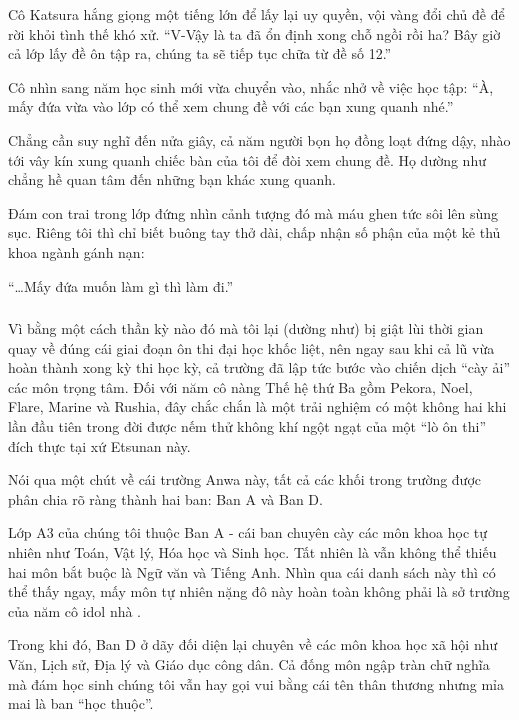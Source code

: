 \documentclass[../main.tex]{subfiles}
\begin{document}
Cô Katsura hắng giọng một tiếng lớn để lấy lại uy quyền, vội vàng đổi chủ đề để rời khỏi tình thế khó xử. ``V-Vậy là ta đã ổn định xong chỗ ngồi rồi ha? Bây giờ cả lớp lấy đề ôn tập ra, chúng ta sẽ tiếp tục chữa từ đề số 12.''

Cô nhìn sang năm học sinh mới vừa chuyển vào, nhắc nhở về việc học tập: ``À, mấy đứa vừa vào lớp có thể xem chung đề với các bạn xung quanh nhé.''

Chẳng cần suy nghĩ đến nửa giây, cả năm người bọn họ đồng loạt đứng dậy, nhào tới vây kín xung quanh chiếc bàn của tôi để đòi xem chung đề. Họ dường như chẳng hề quan tâm đến những bạn khác xung quanh.

Đám con trai trong lớp đứng nhìn cảnh tượng đó mà máu ghen tức sôi lên sùng sục. Riêng tôi thì chỉ biết buông tay thở dài, chấp nhận số phận của một kẻ thủ khoa ngành gánh nạn:

``\dots Mấy đứa muốn làm gì thì làm đi.''

\subsubsection*{\label{ep-C7.2}}

Vì bằng một cách thần kỳ nào đó mà tôi lại (dường như) bị giật lùi thời gian quay về đúng cái giai đoạn ôn thi đại học khốc liệt, nên ngay sau khi cả lũ vừa hoàn thành xong kỳ thi học kỳ, cả trường đã lập tức bước vào chiến dịch ``cày ải'' các môn trọng tâm. Đối với năm cô nàng Thế hệ thứ Ba gồm Pekora, Noel, Flare, Marine và Rushia, đây chắc chắn là một trải nghiệm có một không hai khi lần đầu tiên trong đời được nếm thử không khí ngột ngạt của một ``lò ôn thi'' đích thực tại xứ Etsunan này.

Nói qua một chút về cái trường Anwa này, tất cả các khối trong trường được phân chia rõ ràng thành hai ban: Ban A và Ban D.

Lớp A3 của chúng tôi thuộc Ban A - cái ban chuyên cày các môn khoa học tự nhiên như Toán, Vật lý, Hóa học và Sinh học. Tất nhiên là vẫn không thể thiếu hai môn bắt buộc là Ngữ văn và Tiếng Anh. Nhìn qua cái danh sách này thì có thể thấy ngay, mấy môn tự nhiên nặng đô này hoàn toàn không phải là sở trường của năm cô idol nhà \hll.

Trong khi đó, Ban D ở dãy đối diện lại chuyên về các môn khoa học xã hội như Văn, Lịch sử, Địa lý và Giáo dục công dân. Cả đống môn ngập tràn chữ nghĩa mà đám học sinh chúng tôi vẫn hay gọi vui bằng cái tên thân thương nhưng mỉa mai là ban ``học thuộc''.
\end{document}
